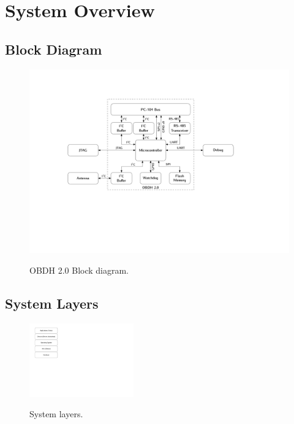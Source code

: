 %
%
%
%
%

%
%
%
%
%
%

\chapter{System Overview} \label{ch:system-overview}

\section{Block Diagram}

\begin{figure}[!ht]
    \begin{center}
        \includegraphics[width=\textwidth]{figures/block_diagram.pdf}
        \label{fig:block-diagram}
        \caption{OBDH 2.0 Block diagram.}
    \end{center}
\end{figure}

\section{System Layers}

\begin{figure}[!ht]
    \begin{center}
        \includegraphics[width=0.4\textwidth]{figures/system_layers.pdf}
        \label{fig:system-layers}
        \caption{System layers.}
    \end{center}
\end{figure}
